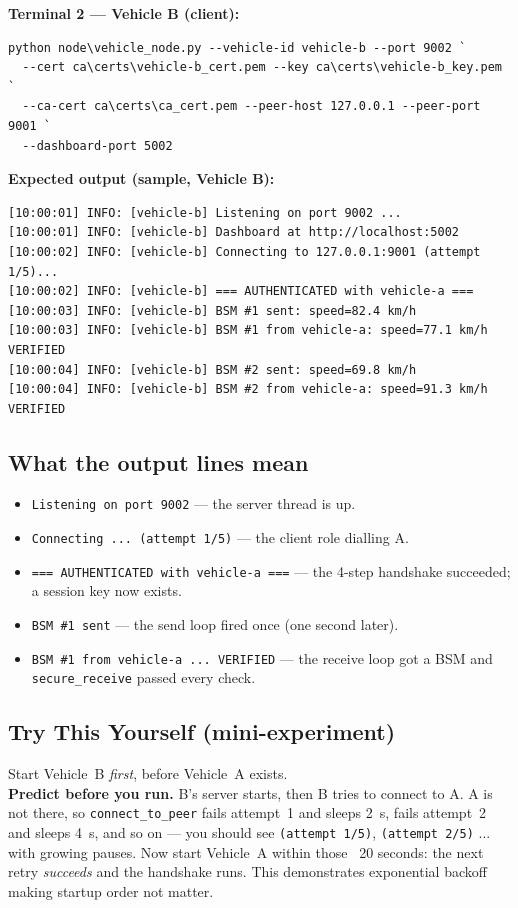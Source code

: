 \documentclass[11pt,a4paper]{report}
\begin{document}
\textbf{Terminal 2 --- Vehicle B (client):}
\begin{lstlisting}[style=term]
python node\vehicle_node.py --vehicle-id vehicle-b --port 9002 `
  --cert ca\certs\vehicle-b_cert.pem --key ca\certs\vehicle-b_key.pem `
  --ca-cert ca\certs\ca_cert.pem --peer-host 127.0.0.1 --peer-port 9001 `
  --dashboard-port 5002
\end{lstlisting}

\noindent\textbf{Expected output (sample, Vehicle B):}
\begin{lstlisting}[style=term]
[10:00:01] INFO: [vehicle-b] Listening on port 9002 ...
[10:00:01] INFO: [vehicle-b] Dashboard at http://localhost:5002
[10:00:02] INFO: [vehicle-b] Connecting to 127.0.0.1:9001 (attempt 1/5)...
[10:00:02] INFO: [vehicle-b] === AUTHENTICATED with vehicle-a ===
[10:00:03] INFO: [vehicle-b] BSM #1 sent: speed=82.4 km/h
[10:00:03] INFO: [vehicle-b] BSM #1 from vehicle-a: speed=77.1 km/h VERIFIED
[10:00:04] INFO: [vehicle-b] BSM #2 sent: speed=69.8 km/h
[10:00:04] INFO: [vehicle-b] BSM #2 from vehicle-a: speed=91.3 km/h VERIFIED
\end{lstlisting}

\subsection{What the output lines mean}
\begin{itemize}
  \item \texttt{Listening on port 9002} --- the server thread is up.
  \item \texttt{Connecting ... (attempt 1/5)} --- the client role dialling A.
  \item \texttt{=== AUTHENTICATED with vehicle-a ===} --- the 4-step handshake
        succeeded; a session key now exists.
  \item \texttt{BSM \#1 sent} --- the send loop fired once (one second later).
  \item \texttt{BSM \#1 from vehicle-a ... VERIFIED} --- the receive loop got a
        BSM and \texttt{secure\_receive} passed every check.
\end{itemize}

\subsection{Try This Yourself (mini-experiment)}
Start Vehicle~B \emph{first}, before Vehicle~A exists.\\
\textbf{Predict before you run.} B's server starts, then B tries to connect to A.
A is not there, so \texttt{connect\_to\_peer} fails attempt~1 and sleeps 2~s,
fails attempt~2 and sleeps 4~s, and so on --- you should see
\texttt{(attempt 1/5)}, \texttt{(attempt 2/5)} ... with growing pauses. Now start
Vehicle~A within those ~20 seconds: the next retry \emph{succeeds} and the
handshake runs. This demonstrates exponential backoff making startup order not
matter.
\end{document}
